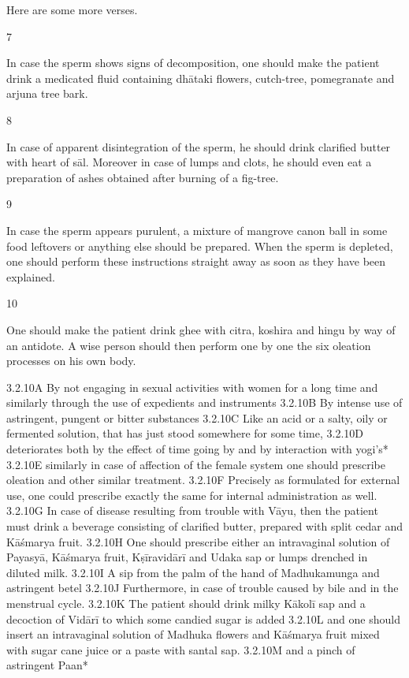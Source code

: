 \begin{translation}
  Here are some more verses.
 
 \item[7]
 
  In case the sperm shows signs of decomposition, one should make the patient 
  drink a medicated fluid containing dhātaki flowers, cutch-tree, pomegranate 
  and arjuna tree bark.
 
 \item[8]
 
  In case of apparent disintegration of the sperm, he should drink clarified butter 
  with heart of sāl. Moreover in case of lumps and clots, he should even eat a 
  preparation of ashes obtained after burning of a fig-tree.
 
 \item[9]
 
  In case the sperm appears purulent, a mixture of mangrove canon ball in some 
  food leftovers or anything else should be prepared. When the sperm is 
  depleted, one should perform these instructions straight away as soon as they 
  have been explained.
 
 \item[10]
 
  One should make the patient drink ghee with citra, koshira and hingu by way of 
  an antidote. A wise person should then perform one by one the six oleation 
  processes on his own body.
  
  
  3.2.10A
  By not engaging in sexual activities with women for a long time and similarly 
  through the use of expedients and instruments
  3.2.10B By intense use of astringent, pungent or bitter substances
  3.2.10C Like an acid or a salty, oily or fermented solution, that has just stood 
  somewhere for some time,
  3.2.10D deteriorates both by the effect of time going by and by interaction with 
  yogi’s*  
  3.2.10E similarly in case of affection of the female system one should prescribe 
  oleation and other  similar treatment.
  3.2.10F Precisely as formulated for external use, one could prescribe exactly 
  the same for internal administration as well.
  3.2.10G In case of disease resulting from trouble with Vāyu, then the patient 
  must drink a beverage consisting of clarified butter, prepared with split cedar 
  and Kāśmarya fruit.
  3.2.10H One should prescribe either an intravaginal solution of Payasyā, 
  Kāśmarya fruit, Kṣīravidārī and Udaka sap or lumps drenched in diluted milk.
  3.2.10I A sip from the palm of the hand of Madhukamunga and astringent betel
  3.2.10J Furthermore, in case of trouble caused by bile and in the menstrual 
  cycle.
  3.2.10K The patient should drink milky Kākolī sap and a decoction of Vidārī to 
  which some candied sugar is added
  3.2.10L and one should insert an intravaginal solution of Madhuka flowers and 
  Kāśmarya fruit mixed with sugar cane juice or a paste with santal sap.
  3.2.10M and a pinch of astringent Paan*
  

\end{translation}
